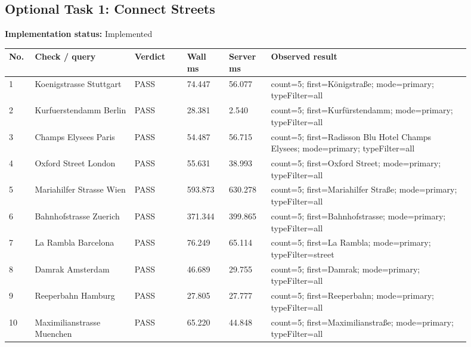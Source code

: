 \documentclass[10pt,a4paper]{article}
\begin{document}
\subsection{Optional Task 1: Connect Streets}
\textbf{Implementation status:} Implemented\\
\scriptsize
\begin{longtable}{|P{0.045\linewidth}|P{0.19\linewidth}|P{0.105\linewidth}|P{0.085\linewidth}|P{0.085\linewidth}|P{0.385\linewidth}|}
\hline
\textbf{No.} & \textbf{Check / query} & \textbf{Verdict} & \textbf{Wall ms} & \textbf{Server ms} & \textbf{Observed result}\\ \hline
{} 1 & Koenigstrasse Stuttgart & PASS & 74.447 & 56.077 & count=5; first=Königstraße; mode=primary; typeFilter=all\\ \hline
{} 2 & Kurfuerstendamm Berlin & PASS & 28.381 & 2.540 & count=5; first=Kurfürstendamm; mode=primary; typeFilter=all\\ \hline
{} 3 & Champs Elysees Paris & PASS & 54.487 & 56.715 & count=5; first=Radisson Blu Hotel Champs Elysees; mode=primary; typeFilter=all\\ \hline
{} 4 & Oxford Street London & PASS & 55.631 & 38.993 & count=5; first=Oxford Street; mode=primary; typeFilter=all\\ \hline
{} 5 & Mariahilfer Strasse Wien & PASS & 593.873 & 630.278 & count=5; first=Mariahilfer Straße; mode=primary; typeFilter=all\\ \hline
{} 6 & Bahnhofstrasse Zuerich & PASS & 371.344 & 399.865 & count=5; first=Bahnhofstrasse; mode=primary; typeFilter=all\\ \hline
{} 7 & La Rambla Barcelona & PASS & 76.249 & 65.114 & count=5; first=La Rambla; mode=primary; typeFilter=street\\ \hline
{} 8 & Damrak Amsterdam & PASS & 46.689 & 29.755 & count=5; first=Damrak; mode=primary; typeFilter=all\\ \hline
{} 9 & Reeperbahn Hamburg & PASS & 27.805 & 27.777 & count=5; first=Reeperbahn; mode=primary; typeFilter=all\\ \hline
{} 10 & Maximilianstrasse Muenchen & PASS & 65.220 & 44.848 & count=5; first=Maximilianstraße; mode=primary; typeFilter=all\\ \hline
\end{longtable}
\normalsize
\end{document}
